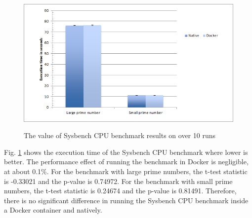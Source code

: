 \documentclass[11pt]{article}
\begin{document}
	
	\begin{figure}
		\centering
		{\includegraphics[width=150mm]{cpu.png}}
		\caption{ The value of Sysbench CPU benchmark results on over 10 runs}
		\label{fig:cpu}
	\end{figure}
	
	Fig. \ref{fig:cpu} shows the execution time of the Sysbench CPU benchmark where lower is better. The performance effect of running the benchmark in Docker is negligible, at about 0.1\%. For the benchmark with large prime numbers, the t-test statistic is -0.33021 and the p-value is 0.74972. For the benchmark with small prime numbers, the t-test statistic is 0.24674 and the p-value is 0.81491. Therefore, there is no significant difference in running the Sysbench CPU benchmark inside a Docker container and natively.  
	
\end{document}
